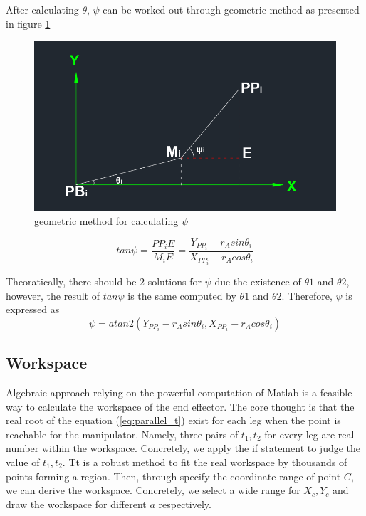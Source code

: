 \documentclass{article}
\begin{document}
After calculating $\theta$, $\psi$ can be worked out through geometric method as presented in figure \ref{fig:Parallel_psi}
\begin{figure}[htbp] 
\begin{center}
\includegraphics[width=\textwidth]{images/Parallel_psi}
\caption{geometric method for calculating $\psi$}
\label{fig:Parallel_psi}
\end{center}
\end{figure}

\begin{equation}
tan\psi = \frac{PP_iE}{M_iE}=\frac{Y_{PP_i}-r_Asin\theta_i}{X_{PP_i}-r_Acos\theta_i}
\end{equation}

Theoratically, there should be 2 solutions for $\psi$ due the existence of $\theta1$ and $\theta2$, however, the result of $tan\psi$ is the same computed by $\theta1$ and $\theta2$. Therefore, $\psi$ is expressed as
\begin{equation}
\psi = atan2(Y_{PP_i}-r_Asin\theta_i,X_{PP_i}-r_Acos\theta_i )
\end{equation}

\subsection{Workspace}
Algebraic approach relying on the powerful computation of Matlab is a feasible way to calculate the workspace of the end effector. The core thought is that the real root of the equation (\ref{eq:parallel_t}) exist for each leg when the point is reachable for the manipulator. Namely, three pairs of $t_1,t_2$ for every leg are real number within the workspace. Concretely, we apply the if statement to judge the value of $t_1, t_2$. Tt is a robust method to fit the real workspace by thousands of points forming a region. Then, through specify the coordinate range of point $C$, we can derive the workspace. Concretely, we select a wide range for $X_c,Y_c$ and draw the workspace for different $a$ respectively.
 
\end{document}
